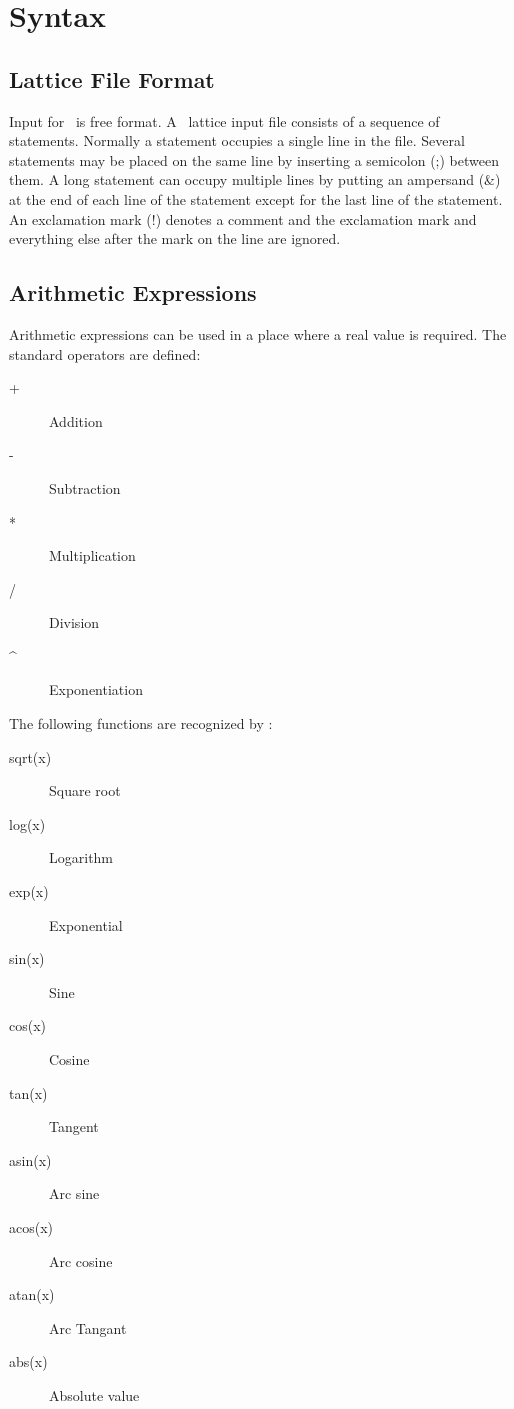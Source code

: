 \chapter{Syntax}

\section{Lattice File Format}

Input for \bmad\ is free format. A \bmad\ lattice input file consists
of a sequence of statements. Normally a statement occupies a single
line in the file. Several statements may be placed on the same line by
inserting a semicolon (;) between them. A long statement can occupy
multiple lines by putting an ampersand (\&) at the end of each line of
the statement except for the last line of the statement. An
exclamation mark (!) denotes a comment and the exclamation mark and
everything else after the mark on the line are ignored.

\section{Arithmetic Expressions}

Arithmetic expressions can be used in a place where a real value is required.
The standard operators are defined:
\begin{description}
\item[+] Addition
\item[-] Subtraction
\item[*] Multiplication
\item[/] Division
\item[\^] Exponentiation
\end{description}

The following functions are recognized by \bmad:
\begin{description}
\item[sqrt(x)] Square root 
\item[log(x)]  Logarithm
\item[exp(x)]  Exponential
\item[sin(x)]  Sine
\item[cos(x)]  Cosine
\item[tan(x)]  Tangent
\item[asin(x)] Arc sine
\item[acos(x)] Arc cosine
\item[atan(x)] Arc Tangant
\item[abs(x)]  Absolute value
\end{description}


